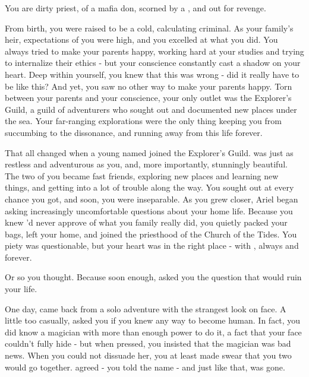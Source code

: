 \documentclass[char]{NeptuneBall}
\begin{document}
\name{\cPriest{}}


You are dirty priest, \cPriest{\offspring} of a mafia don, scorned by a \cAriel{\Prince}, and out for revenge.

From birth, you were raised to be a cold, calculating criminal. As your family's heir, expectations of you were high, and you excelled at what you did. You always tried to make your parents happy, working hard at your studies and trying to internalize their ethics - but your conscience constantly cast a shadow on your heart. Deep within yourself, you knew that this was wrong - did it really have to be like this? And yet, you saw no other way to make your parents happy. Torn between your parents and your conscience, your only outlet was the Explorer's Guild, a guild of adventurers who sought out and documented new places under the sea. Your far-ranging explorations were the only thing keeping you from succumbing to the dissonance, and running away from this life forever.

That all changed when a young \cAriel{\prince} named \cAriel{} joined the Explorer's Guild. \cAriel{\They} was just as restless and adventurous as you, and, more importantly, stunningly beautiful. The two of you became fast friends, exploring new places and learning new things, and getting into a lot of trouble along the way. You sought \cAriel{\them} out at every chance you got, and soon, you were inseparable. As you grew closer, Ariel began asking increasingly uncomfortable questions about your home life. Because you knew \cAriel{\they}'d never approve of what you family really did, you quietly packed your bags, left your home, and joined the priesthood of the Church of the Tides. You piety was questionable, but your heart was in the right place - with \cAriel{}, always and forever.

Or so you thought. Because soon enough, \cAriel{} asked you the question that would ruin your life. 

One day, \cAriel{} came back from a solo adventure with the strangest look on \cAriel{\their} face. A little too casually, \cAriel{\they} asked you if you knew any way to become human. In fact, you did know a magician with more than enough power to do it, a fact that your face couldn't fully hide - but when \cAriel{\they} pressed, you insisted that the magician was bad news. When you could not dissuade her, you at least made \cAriel{\them} swear that you two would go together. \cAriel{\They} agreed - you told \cAriel{\them} the name \cWitch{} - and just like that, \cAriel{\they} was gone. 
\end{document}
